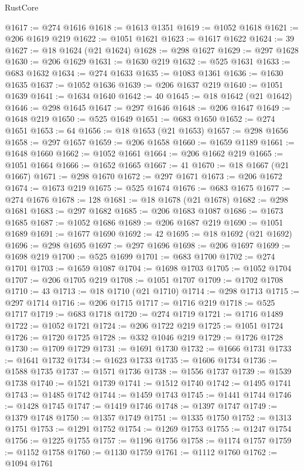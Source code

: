 \begin{lexlean}{RustCore}
\begin{coremodule}
@1617 := @274 @1616
@1618 := @1613 @1351
@1619 := @1052 @1618
@1621 := @206 @1619 @219
@1622 := @1051 @1621
@1623 := @1617 @1622
@1624 := 39
@1627 := @18 @1624 (@21 @1624)
@1628 := @298 @1627
@1629 := @297 @1628
@1630 := @206 @1629
@1631 := @1630 @219
@1632 := @525 @1631
@1633 := @683 @1632
@1634 := @274 @1633
@1635 := @1083 @1361
@1636 := @1630 @1635
@1637 := @1052 @1636
@1639 := @206 @1637 @219
@1640 := @1051 @1639
@1641 := @1634 @1640
@1642 := 40
@1645 := @18 @1642 (@21 @1642)
@1646 := @298 @1645
@1647 := @297 @1646
@1648 := @206 @1647
@1649 := @1648 @219
@1650 := @525 @1649
@1651 := @683 @1650
@1652 := @274 @1651
@1653 := 64
@1656 := @18 @1653 (@21 @1653)
@1657 := @298 @1656
@1658 := @297 @1657
@1659 := @206 @1658
@1660 := @1659 @1189
@1661 := @1648 @1660
@1662 := @1052 @1661
@1664 := @206 @1662 @219
@1665 := @1051 @1664
@1666 := @1652 @1665
@1667 := 41
@1670 := @18 @1667 (@21 @1667)
@1671 := @298 @1670
@1672 := @297 @1671
@1673 := @206 @1672
@1674 := @1673 @219
@1675 := @525 @1674
@1676 := @683 @1675
@1677 := @274 @1676
@1678 := 128
@1681 := @18 @1678 (@21 @1678)
@1682 := @298 @1681
@1683 := @297 @1682
@1685 := @206 @1683 @1087
@1686 := @1673 @1685
@1687 := @1052 @1686
@1689 := @206 @1687 @219
@1690 := @1051 @1689
@1691 := @1677 @1690
@1692 := 42
@1695 := @18 @1692 (@21 @1692)
@1696 := @298 @1695
@1697 := @297 @1696
@1698 := @206 @1697
@1699 := @1698 @219
@1700 := @525 @1699
@1701 := @683 @1700
@1702 := @274 @1701
@1703 := @1659 @1087
@1704 := @1698 @1703
@1705 := @1052 @1704
@1707 := @206 @1705 @219
@1708 := @1051 @1707
@1709 := @1702 @1708
@1710 := 43
@1713 := @18 @1710 (@21 @1710)
@1714 := @298 @1713
@1715 := @297 @1714
@1716 := @206 @1715
@1717 := @1716 @219
@1718 := @525 @1717
@1719 := @683 @1718
@1720 := @274 @1719
@1721 := @1716 @1489
@1722 := @1052 @1721
@1724 := @206 @1722 @219
@1725 := @1051 @1724
@1726 := @1720 @1725
@1728 := @332 @1046 @219
@1729 := @1726 @1728
@1730 := @1709 @1729
@1731 := @1691 @1730
@1732 := @1666 @1731
@1733 := @1641 @1732
@1734 := @1623 @1733
@1735 := @1606 @1734
@1736 := @1588 @1735
@1737 := @1571 @1736
@1738 := @1556 @1737
@1739 := @1539 @1738
@1740 := @1521 @1739
@1741 := @1512 @1740
@1742 := @1495 @1741
@1743 := @1485 @1742
@1744 := @1459 @1743
@1745 := @1441 @1744
@1746 := @1428 @1745
@1747 := @1419 @1746
@1748 := @1397 @1747
@1749 := @1379 @1748
@1750 := @1357 @1749
@1751 := @1335 @1750
@1752 := @1313 @1751
@1753 := @1291 @1752
@1754 := @1269 @1753
@1755 := @1247 @1754
@1756 := @1225 @1755
@1757 := @1196 @1756
@1758 := @1174 @1757
@1759 := @1152 @1758
@1760 := @1130 @1759
@1761 := @1112 @1760
@1762 := @1094 @1761

\end{coremodule}
\end{lexlean}
